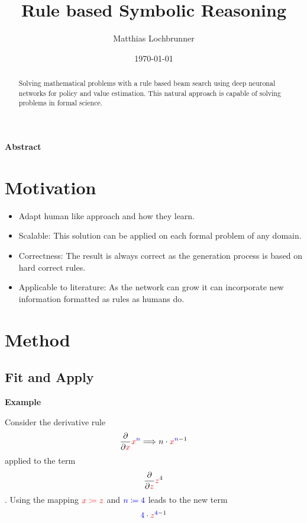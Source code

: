 \documentclass{scrartcl}
\title{Rule based Symbolic Reasoning}
\author{Matthias Lochbrunner}
\date{\today}
\begin{document}
\maketitle
\begin{center}
	\textbf{Abstract}
\end{center}
\begin{abstract}
	Solving mathematical problems with a rule based beam search using deep neuronal networks for policy and value estimation.
	This natural approach is capable of solving problems in formal science. 
\end{abstract}

\section{Motivation}
\begin{itemize}
	\item Adapt human like approach and how they learn.
	\item Scalable: This solution can be applied on each formal problem of any domain.
	\item Correctness: The result is always correct as the generation process is based on hard correct rules.
	\item Applicable to literature: As the network can grow it can incorporate new information formatted as rules as humans do. 
\end{itemize}

\section{Method}

\subsection{Fit and Apply}

\textbf{Example}

Consider the derivative rule
\begin{align}
	\frac{\partial}{\partial {\color{red}x}} {\color{red}x}^{\color{blue}n} \Longrightarrow n\cdot {\color{red}x}^{{\color{blue}n}-1} 
\end{align}
applied to the term
\begin{align}
	\frac{\partial}{\partial {\color{red}z}} {\color{red}z}^4 
\end{align}.
Using the mapping ${\color{red}x \coloneqq z}$ and ${\color{blue}n \coloneqq {\color{blue}4}}$ leads to the new term
\begin{align}
	{\color{blue}4}\cdot {\color{red}z}^{{\color{blue}4}-1} 
\end{align}
\end{document}
